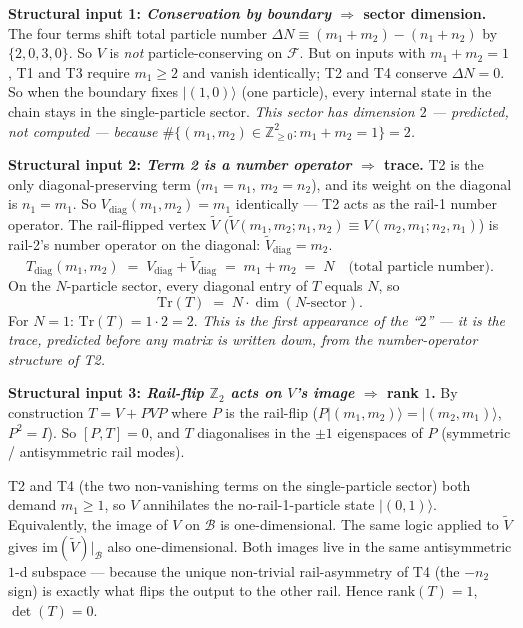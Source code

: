 \documentclass[11pt,a4paper]{article}
\begin{document}
\bigskip
\noindent\textbf{Structural input 1: \emph{Conservation by boundary} $\Rightarrow$ sector dimension.}
The four terms shift total particle number $\Delta N \equiv (m_1{+}m_2)-(n_1{+}n_2)$ by $\{2,0,3,0\}$. So $V$ is \emph{not} particle-conserving on $\mathcal{F}$. But on inputs with $m_1{+}m_2 = 1$, T1 and T3 require $m_1\ge 2$ and vanish identically; T2 and T4 conserve $\Delta N = 0$. So when the boundary fixes $|(1,0)\rangle$ (one particle), every internal state in the chain stays in the single-particle sector. \emph{This sector has dimension $2$ --- predicted, not computed --- because $\#\{(m_1,m_2)\in\mathbb{Z}_{\ge 0}^2: m_1{+}m_2=1\}=2$.}

\bigskip
\noindent\textbf{Structural input 2: \emph{Term 2 is a number operator} $\Rightarrow$ trace.}
T2 is the only diagonal-preserving term ($m_1{=}n_1$, $m_2{=}n_2$), and its weight on the diagonal is $n_1 = m_1$. So $V_{\mathrm{diag}}(m_1,m_2) = m_1$ identically --- T2 acts as the rail-1 number operator. The rail-flipped vertex $\widetilde V$ ($\widetilde V(m_1,m_2;n_1,n_2) \equiv V(m_2,m_1;n_2,n_1)$) is rail-2's number operator on the diagonal: $\widetilde V_{\mathrm{diag}} = m_2$.
\[
\boxed{\;
T_{\mathrm{diag}}(m_1,m_2) \;=\; V_{\mathrm{diag}} + \widetilde V_{\mathrm{diag}} \;=\; m_1 + m_2 \;=\; N \quad\text{(total particle number)}.
\;}
\]
On the $N$-particle sector, every diagonal entry of $T$ equals $N$, so
\[
\mathrm{Tr}(T) \;=\; N \cdot \dim(\text{$N$-sector}).
\]
For $N=1$: $\mathrm{Tr}(T) = 1\cdot 2 = 2$. \emph{This is the first appearance of the ``$2$'' --- it is the trace, predicted before any matrix is written down, from the number-operator structure of T2.}

\bigskip
\noindent\textbf{Structural input 3: \emph{Rail-flip $\mathbb{Z}_2$ acts on $V$'s image} $\Rightarrow$ rank $1$.}
By construction $T = V + PVP$ where $P$ is the rail-flip ($P|(m_1,m_2)\rangle = |(m_2,m_1)\rangle$, $P^2=I$). So $[P,T]=0$, and $T$ diagonalises in the $\pm 1$ eigenspaces of $P$ (symmetric / antisymmetric rail modes).

T2 and T4 (the two non-vanishing terms on the single-particle sector) both demand $m_1\ge 1$, so $V$ annihilates the no-rail-1-particle state $|(0,1)\rangle$. Equivalently, the image of $V$ on $\mathcal{B}$ is one-dimensional. The same logic applied to $\widetilde V$ gives $\mathrm{im}(\widetilde V)|_{\mathcal{B}}$ also one-dimensional. Both images live in the same antisymmetric $1$-d subspace --- because the unique non-trivial rail-asymmetry of T4 (the $-n_2$ sign) is exactly what flips the output to the other rail. Hence $\mathrm{rank}(T) = 1$, $\det(T) = 0$.
\end{document}
